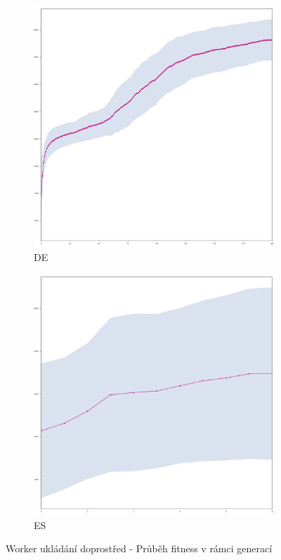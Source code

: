	\begin{figure}[p]
		\centering
		\begin{subfigure}{.5\textwidth}
			\centering
			\includegraphics[width=\linewidth]{../img/WoodMap/DE/graph_of_WorkerStockMem-mean.png}
			\caption{DE}
			\label{obr04:StockDE}
		\end{subfigure}%
		\begin{subfigure}{.5\textwidth}
			\centering
			\includegraphics[width=\linewidth]{../img/WoodMap/ES/WoodStockES-mean.png}
			\caption{ES}
			\label{obr04:StockES}
		\end{subfigure}
		\caption{Worker ukládání doprostřed  - Průběh fitness v rámci generací}
		\label{obr04:Stock}
	\end{figure}
	\clearpage
